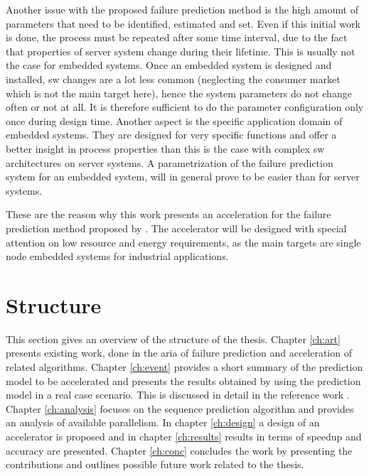 \documentclass[mscthesis]{usiinfthesis}
\begin{document}
Another issue with the proposed failure prediction method is the high amount of
parameters that need to be identified, estimated and set. Even if this initial
work is done, the process must be repeated after some time interval, due to the
fact that properties of server system change during their lifetime. This is
usually not the case for embedded systems. Once an embedded system is designed
and installed, \gls{sw} changes are a lot less common (neglecting the consumer
market which is not the main target here), hence the system parameters do not
change often or not at all. It is therefore sufficient to do the parameter
configuration only once during design time. Another aspect is the specific
application domain of embedded systems. They are designed for very specific
functions and offer a better insight in process properties than this is the
case with complex \gls{sw} architectures on server systems. A parametrization
of the failure prediction system for an embedded system, will in general prove
to be easier than for server systems.

These are the reason why this work presents an acceleration for the failure
prediction method proposed by \cite{salfner08}. The accelerator will be designed
with special attention on low resource and energy requirements, as the main
targets are single node embedded systems for industrial applications.

\section{Structure}
\label{ch:intro_struct}

This section gives an overview of the structure of the thesis. Chapter
\ref{ch:art} presents existing work, done in the aria of failure prediction and
acceleration of related algorithms. Chapter \ref{ch:event} provides a short
summary of the prediction model to be accelerated and presents the results
obtained by using the prediction model in a real case scenario. This is
discussed in detail in the reference work \cite{salfner08}. Chapter
\ref{ch:analysis} focuses on the sequence prediction algorithm and provides an
analysis of available parallelism. In chapter \ref{ch:design} a design of an
accelerator is proposed and in chapter \ref{ch:results} results in terms of
speedup and accuracy are presented. Chapter \ref{ch:conc} concludes the work
by presenting the contributions and outlines possible future work related to
the thesis.
\end{document}
